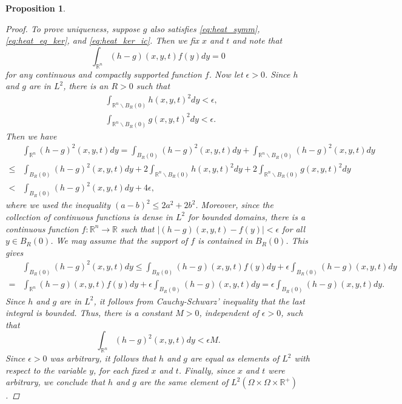 \documentclass{amsart}
\newtheorem{proposition}[theorem]{Proposition}
\theoremstyle{definition}
\newcommand*{\R}{\mathbb{R}}
\begin{document}
\begin{proposition}
\begin{proof}
    To prove uniqueness, suppose $g$ also satisfies \eqref{eq:heat_symm}, \eqref{eq:heat_eq_ker}, and \eqref{eq:heat_ker_ic}. Then we fix $x$ and $t$ and note that 
    \begin{equation*}
        \int_{\R^n} (h-g)(x,y,t)f(y) dy = 0
    \end{equation*}
    for any continuous and compactly supported function $f$. Now let $\epsilon > 0$. Since $h$ and $g$ are in $L^2$, there is an $R > 0$ such that
    \begin{align*}
        &\int_{\R^n \backslash B_R(0)} h(x,y,t)^2 dy < \epsilon, \\
        &\int_{\R^n \backslash B_R(0)} g(x,y,t)^2 dy < \epsilon. 
    \end{align*}
    Then we have
    \begin{align*}
        &\int_{\R^n} (h-g)^2(x,y,t) dy = \int_{B_R(0)} (h-g)^2(x,y,t) dy + \int_{\R^n\backslash B_R(0)} (h-g)^2(x,y,t) dy \\
        \leq &\int_{B_R(0)} (h-g)^2(x,y,t) dy + 2\int_{\R^n\backslash B_R(0)} h(x,y,t)^2 dy + 2\int_{\R^n\backslash B_R(0)} g(x,y,t)^2 dy \\
        < &\int_{B_R(0)} (h-g)^2(x,y,t) dy + 4\epsilon,
    \end{align*}
    where we used the inequality $(a-b)^2 \leq 2a^2 + 2b^2$. Moreover, since the collection of continuous functions is dense in $L^2$ for bounded domains, there is a continuous function $f : \R^n \to \R$ such that $|(h-g)(x,y,t) - f(y)| < \epsilon$ for all $y \in B_R(0)$. We may assume that the support of $f$ is contained in $B_R(0)$. This gives
    \begin{align*}
        &\int_{B_R(0)} (h-g)^2(x,y,t) dy \leq \int_{B_R(0)} (h-g)(x,y,t)f(y) dy + \epsilon\int_{B_R(0)} (h-g)(x,y,t) dy \\
         = &\int_{\R^n} (h-g)(x,y,t)f(y) dy + \epsilon\int_{B_R(0)} (h-g)(x,y,t) dy = \epsilon\int_{B_R(0)} (h-g)(x,y,t) dy.
    \end{align*}
    Since $h$ and $g$ are in $L^2$, it follows from Cauchy-Schwarz' inequality that the last integral is bounded. Thus, there is a constant $M > 0$, independent of $\epsilon > 0$, such that 
    \begin{equation*}
        \int_{\R^n} (h-g)^2(x,y,t) dy < \epsilon M.
    \end{equation*}
    Since $\epsilon > 0$ was arbitrary, it follows that $h$ and $g$ are equal as elements of $L^2$ with respect to the variable $y$, for each fixed $x$ and $t$. Finally, since $x$ and $t$ were arbitrary, we conclude that $h$ and $g$ are the same element of $L^2(\Omega \times \Omega \times \R^+)$. 
    \end{proof} 
\end{proposition}
\end{document}
